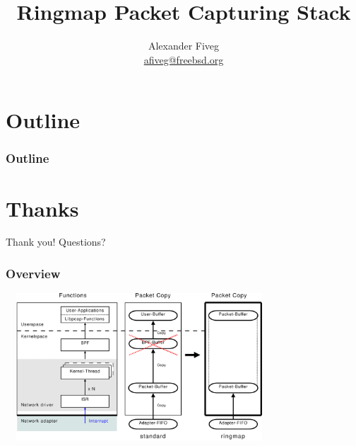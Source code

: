 \documentclass{beamer}
\title{Ringmap Packet Capturing Stack}
\author[Alexander Fiveg]{ Alexander Fiveg \\
\url{afiveg@freebsd.org} }
\begin{document}
\frame{\titlepage}


\section*{Outline}
\begin{frame}
\frametitle{Outline}
\tableofcontents
\end{frame}











\section*{Thanks}
\begin{frame}
	\begin{center}
	\huge{Thank you! Questions?}
	\end{center}
\end{frame}

\begin{frame}
\frametitle{Overview}
\begin{center}
\includegraphics [height=55mm,width=100mm]{pics/Ueberblick_new_summit}
\end{center}
\end{frame}
\end{document}
